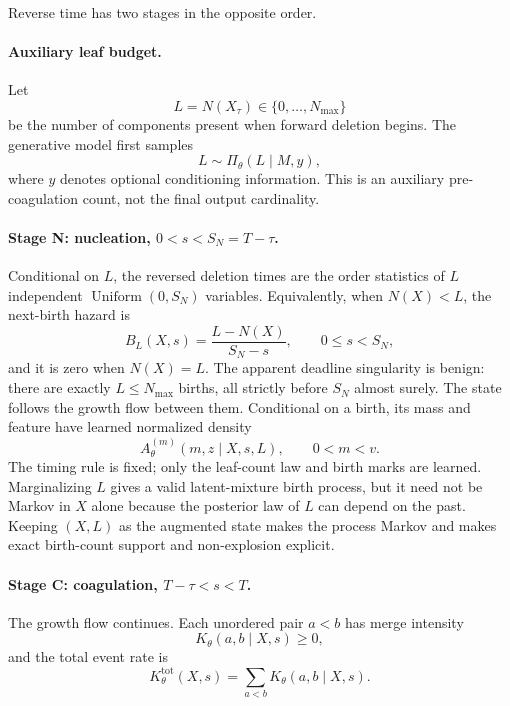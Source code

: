 \documentclass[10pt]{article}
\theoremstyle{definition}
\theoremstyle{remark}
\begin{document}
Reverse time has two stages in the opposite order.

\paragraph{Auxiliary leaf budget.}
Let
\begin{equation}
  L=N(X_\tau)\in\{0,\ldots,N_{\max}\}
  \label{eq:leaf-budget}
\end{equation}
be the number of components present when forward deletion begins.  The
generative model first samples
\begin{equation}
  L\sim\Pi_\theta(L\mid M,y),
  \label{eq:leaf-count-model}
\end{equation}
where $y$ denotes optional conditioning information.  This is an auxiliary
pre-coagulation count, not the final output cardinality.

\paragraph{Stage N: nucleation, $0<s<S_N=T-\tau$.}
Conditional on $L$, the reversed deletion times are the order statistics of
$L$ independent $\operatorname{Uniform}(0,S_N)$ variables.  Equivalently,
when $N(X)<L$, the next-birth hazard is
\begin{equation}
  B_L(X,s)=\frac{L-N(X)}{S_N-s},
  \qquad 0\leq s<S_N,
  \label{eq:fixed-birth-bridge}
\end{equation}
and it is zero when $N(X)=L$.  The apparent deadline singularity is benign:
there are exactly $L\leq N_{\max}$ births, all strictly before $S_N$ almost
surely.  The state follows the growth flow between them.  Conditional on a
birth, its mass and feature have learned normalized density
\begin{equation}
  A_\theta^{(m)}(m,z\mid X,s,L),
  \qquad 0<m<v.
  \label{eq:birth-mark-model}
\end{equation}
The timing rule is fixed; only the leaf-count law and birth marks are learned.
Marginalizing $L$ gives a valid latent-mixture birth process, but it need not
be Markov in $X$ alone because the posterior law of $L$ can depend on the
past.  Keeping $(X,L)$ as the augmented state makes the process Markov and
makes exact birth-count support and non-explosion explicit.

\paragraph{Stage C: coagulation, $T-\tau<s<T$.}
The growth flow continues.  Each unordered pair $a<b$ has merge intensity
\begin{equation}
  K_\theta(a,b\mid X,s)\geq0,
  \label{eq:merge-model}
\end{equation}
and the total event rate is
\begin{equation}
  K_\theta^{\mathrm{tot}}(X,s)
  =\sum_{a<b}K_\theta(a,b\mid X,s).
  \label{eq:total-merge-rate}
\end{equation}
\end{document}
